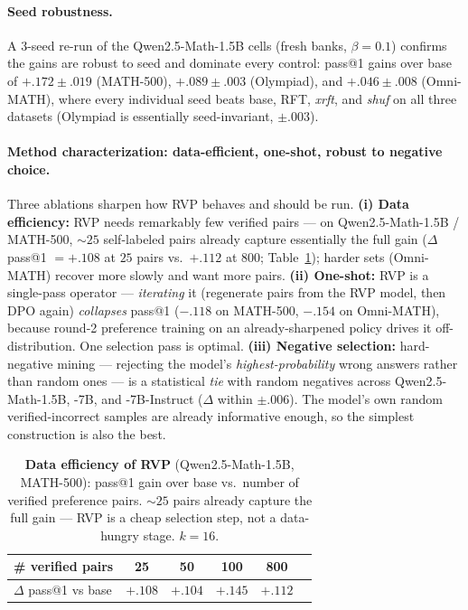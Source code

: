 \paragraph{Seed robustness.}
A 3-seed re-run of the Qwen2.5-Math-1.5B cells (fresh banks, $\beta{=}0.1$) confirms the gains are
robust to seed and dominate every control: pass@1 gains over base of $+.172{\pm}.019$ (MATH-500),
$+.089{\pm}.003$ (Olympiad), and $+.046{\pm}.008$ (Omni-MATH), where every individual seed beats
base, RFT, \emph{xrft}, and \emph{shuf} on all three datasets (Olympiad is essentially
seed-invariant, ${\pm}.003$).

\paragraph{Method characterization: data-efficient, one-shot, robust to negative choice.}
Three ablations sharpen how RVP behaves and should be run. \textbf{(i) Data efficiency:} RVP needs
remarkably few verified pairs --- on Qwen2.5-Math-1.5B / MATH-500, $\sim\!25$ self-labeled pairs
already capture essentially the full gain ($\Delta$pass@1 ${=}{+}.108$ at $25$ pairs vs.\ ${+}.112$
at $800$; Table~\ref{tab:dataeff}); harder sets (Omni-MATH) recover more slowly and want more pairs.
\textbf{(ii) One-shot:} RVP is a single-pass operator --- \emph{iterating} it (regenerate pairs from
the RVP model, then DPO again) \emph{collapses} pass@1 ($-.118$ on MATH-500, $-.154$ on Omni-MATH),
because round-2 preference training on an already-sharpened policy drives it off-distribution. One
selection pass is optimal. \textbf{(iii) Negative selection:} hard-negative mining --- rejecting the
model's \emph{highest-probability} wrong answers rather than random ones --- is a statistical
\emph{tie} with random negatives across Qwen2.5-Math-1.5B, -7B, and -7B-Instruct ($\Delta$ within
$\pm.006$). The model's own random verified-incorrect samples are already informative enough, so the
simplest construction is also the best.

\begin{table}[htbp]
\centering
\caption{\textbf{Data efficiency of RVP} (Qwen2.5-Math-1.5B, MATH-500): pass@1 gain over base vs.\
number of verified preference pairs. $\sim\!25$ pairs already capture the full gain --- RVP is a
cheap selection step, not a data-hungry stage. $k{=}16$.}
\label{tab:dataeff}
\begin{tabular}{lccccc}
\toprule
\# verified pairs & 25 & 50 & 100 & 800 \\
\midrule
$\Delta$ pass@1 vs base & $+.108$ & $+.104$ & $+.145$ & $+.112$ \\
\bottomrule
\end{tabular}
\end{table}

